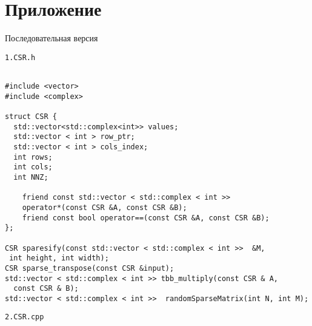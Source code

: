 \documentclass{report}
\begin{document}
\section*{Приложение}
\par Последовательная версия
\par \verb|1.CSR.h|
\begin{lstlisting}

#include <vector>
#include <complex>

struct CSR {
  std::vector<std::complex<int>> values;
  std::vector < int > row_ptr;
  std::vector < int > cols_index;
  int rows;
  int cols;
  int NNZ;

    friend const std::vector < std::complex < int >>
    operator*(const CSR &A, const CSR &B);
    friend const bool operator==(const CSR &A, const CSR &B);
};

CSR sparesify(const std::vector < std::complex < int >>  &M,
 int height, int width);
CSR sparse_transpose(const CSR &input);
std::vector < std::complex < int >> tbb_multiply(const CSR & A,
  const CSR & B);
std::vector < std::complex < int >>  randomSparseMatrix(int N, int M);

\end{lstlisting}
\par \verb|2.CSR.cpp|
\end{document}
